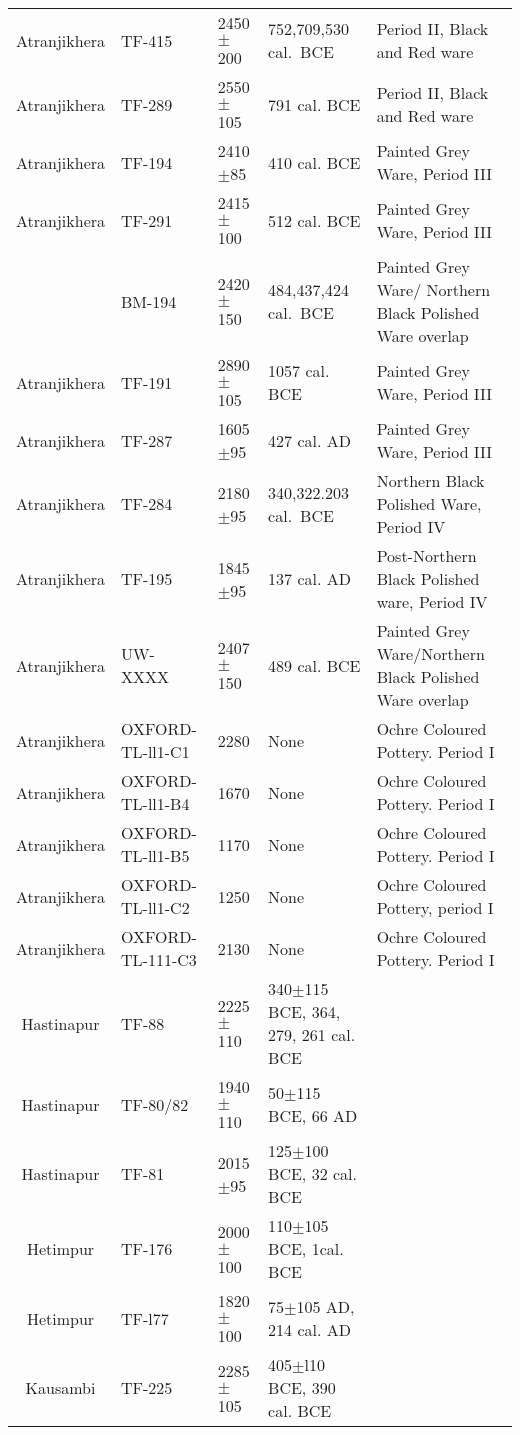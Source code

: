 {{\begin{longtable}{|c|p{1.1cm}|p{1.2cm}|p{1.8cm}|p{3.3cm}|}
Atranjikhera & TF-415 & 2450$\pm$200 & 752,709,530 \hbox{cal. BCE} & Period II, Black and Red ware\\
Atranjikhera & TF-289 &2550$\pm$105 &791 cal. BCE &Period II, Black and Red ware\\
Atranjikhera & TF-194 & 2410$\pm$85 &410 cal. BCE &Painted Grey Ware, Period III\\
Atranjikhera & TF-291 &2415$\pm$100 & 512 cal. BCE &Painted Grey Ware, Period III\\
& BM-194 & 2420$\pm$150 & 484,437,424 \hbox{cal. BCE} & Painted Grey Ware/ Northern Black Polished Ware overlap\\
Atranjikhera & TF-191 & 2890$\pm$105 & 1057 cal. BCE & Painted Grey Ware, Period III\\
Atranjikhera & TF-287 & 1605$\pm$95 & 427 cal. AD &Painted Grey Ware, Period III\\
Atranjikhera & TF-284 & 2180$\pm$95 & 340,322.203 \hbox{cal. BCE} & Northern Black Polished Ware, Period IV\\
Atranjikhera & TF-195 & 1845$\pm$95 & 137 cal. AD & Post-Northern Black Polished ware, Period IV\\
Atranjikhera & UW-XXXX & 2407$\pm$150 & 489 cal. BCE & Painted Grey Ware/Northern Black Polished Ware overlap\\
Atranjikhera & OXFORD- TL-ll1-C1 & 2280 & None & Ochre Coloured Pottery. Period I\\
Atranjikhera & OXFORD- TL-ll1-B4 & 1670 & None & Ochre Coloured Pottery. Period I\\
Atranjikhera & OXFORD- TL-ll1-B5 & 1170 & None & Ochre Coloured Pottery. Period I\\
Atranjikhera & OXFORD- TL-ll1-C2 & 1250 & None & Ochre Coloured Pottery, period I\\
Atranjikhera & OXFORD- TL-111-C3 & 2130 & None & Ochre Coloured Pottery. Period I\\
Hastinapur & TF-88 & 2225$\pm$110 & 340$\pm$115 BCE, 364, 279, 261 cal. BCE &\\
Hastinapur & TF-80/82 & 1940$\pm$110 & 50$\pm$115 BCE, 66 AD &\\
Hastinapur & TF-81 & 2015$\pm$95 & 125$\pm$100 BCE, 32 cal. BCE &\\
Hetimpur & TF-176 & 2000$\pm$100 & 110$\pm$105 BCE, 1cal. BCE &\\
Hetimpur & TF-l77 & 1820$\pm$100 & 75$\pm$105 AD, 214 cal. AD &\\
Kausambi & TF-225 & 2285$\pm$105 & 405$\pm$l10 BCE, 390 cal. BCE &\\

\end{longtable}}}
